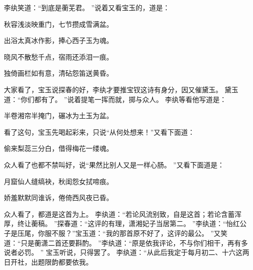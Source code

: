 \hop
李纨笑道：“到底是蘅芜君。
”说着又看宝玉的，道是：\par
\hop
秋容浅淡映重门，七节攒成雪满盆。
\par
出浴太真冰作影，捧心西子玉为魂。
\par
晓风不散愁千点，宿雨还添泪一痕。
\par
独倚画栏如有意，清砧怨笛送黄昏。
\par
\hop
大家看了，宝玉说探春的好，李纨才要推宝钗这诗有身分，因又催黛玉。
黛玉道：“你们都有了。
”说着提笔一挥而就，掷与众人。
李纨等看他写道是：\par
\hop
半卷湘帘半掩门，碾冰为土玉为盆。
\par
\hop
看了这句，宝玉先喝起彩来，只说“从何处想来！”又看下面道：\par
\hop
偷来梨蕊三分白，借得梅花一缕魂。
\par
\hop
众人看了也都不禁叫好，说“果然比别人又是一样心肠。
”又看下面道是：\par
\hop
月窟仙人缝缟袂，秋闺怨女拭啼痕。
\par
娇羞默默同谁诉，倦倚西风夜已昏。
\par
\hop
众人看了，都道是这首为上。
李纨道：“若论风流别致，自是这首；若论含蓄浑厚，终让蘅稿。
”探春道：“这评的有理，潇湘妃子当居第二。
”李纨道：“怡红公子是压尾，你服不服？”宝玉道：“我的那首原不好了，这评的最公。
”又笑道：“只是蘅潇二首还要斟酌。
”李纨道：“原是依我评论，不与你们相干，再有多说者必罚。
”
宝玉听说，只得罢了。
李纨道：“从此后我定于每月初二、十六这两日开社，出题限韵都要依我。
